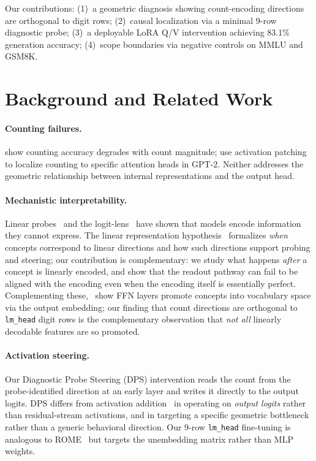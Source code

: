 \documentclass{article}
\begin{document}
Our contributions: (1)~a geometric diagnosis showing count-encoding directions
are orthogonal to digit rows; (2)~causal localization via a minimal 9-row
diagnostic probe; (3)~a deployable LoRA Q/V intervention achieving 83.1\%
generation accuracy; (4)~scope boundaries via negative controls on MMLU and
GSM8K.

\section{Background and Related Work}
\label{sec:background}

\paragraph{Counting failures.}
\citet{razeghi2022impact} show counting accuracy degrades with count magnitude;
\citet{stolfo2023mechanistic} use activation patching to localize counting to
specific attention heads in GPT-2. Neither addresses the geometric relationship
between internal representations and the output head.

\paragraph{Mechanistic interpretability.}
Linear probes~\citep{alain2016understanding,hewitt2019designing} and the
logit-lens~\citep{nostalgebraist2020logitlens,belrose2023eliciting} have shown
that models encode information they cannot express. The linear representation
hypothesis~\citep{park2023linear} formalizes \emph{when} concepts correspond to
linear directions and how such directions support probing and steering; our
contribution is complementary: we study what happens \emph{after} a concept is
linearly encoded, and show that the readout pathway can fail to be aligned with
the encoding even when the encoding itself is essentially perfect.
Complementing
these,~\citet{geva2021transformer} show FFN layers promote concepts into
vocabulary space via the output embedding; our finding that count directions
are orthogonal to \texttt{lm\_head} digit rows is the complementary
observation that \emph{not all} linearly decodable features are so promoted.

\paragraph{Activation steering.}
Our Diagnostic Probe Steering (DPS) intervention reads the count from the
probe-identified direction at an early layer and writes it directly to the
output logits. DPS differs from activation
addition~\citep{turner2023activation,zou2023representation} in operating on
\emph{output logits} rather than residual-stream activations, and in targeting a
specific geometric bottleneck rather than a generic behavioral direction. Our
9-row \texttt{lm\_head} fine-tuning is analogous to
ROME~\citep{meng2022locating} but targets the unembedding matrix rather than
MLP weights.
\end{document}
